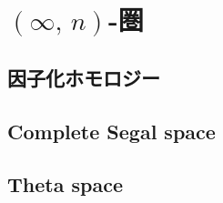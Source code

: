 \documentclass[TQFT_main]{subfiles}
\begin{document}


\section{$(\infty,\, n)$-圏}

\subsection{因子化ホモロジー}

\subsection{Complete Segal space}

\subsection{Theta space}
\end{document}
